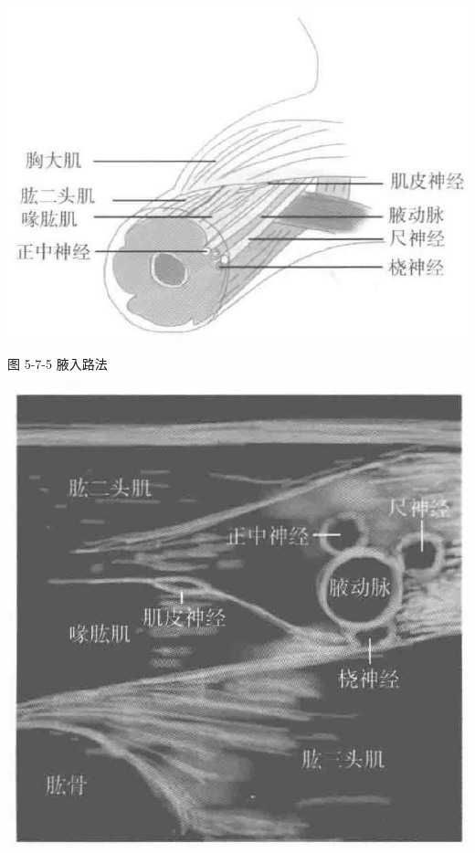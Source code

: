 \documentclass[10pt]{article}
\begin{document}
\begin{center}
\includegraphics[max width=\textwidth]{2024_07_05_645bb794a4d4f32ee0c8g-320}
\end{center}

图 5-7-5 腋入路法

\begin{center}
\includegraphics[max width=\textwidth]{2024_07_05_645bb794a4d4f32ee0c8g-320(1)}
\end{center}
\end{document}
